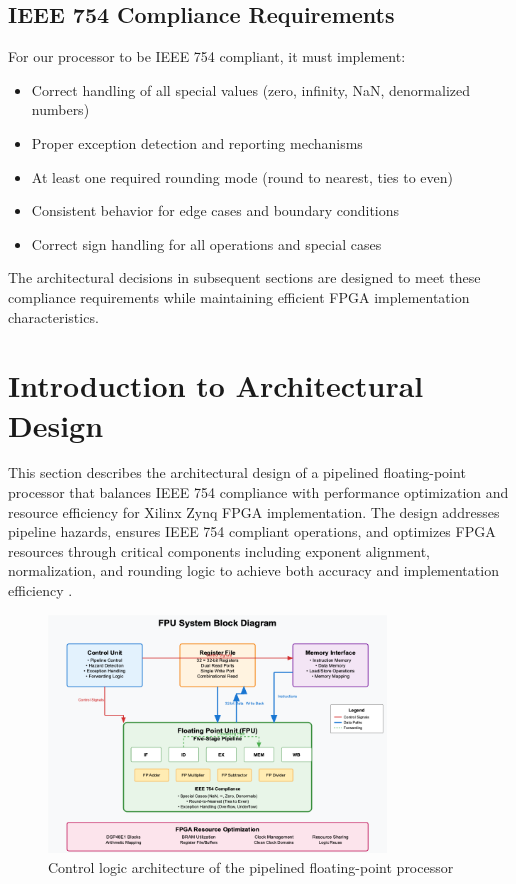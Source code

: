 \subsection{IEEE 754 Compliance Requirements}
\label{subsec:ieee754_compliance}

For our processor to be IEEE 754 compliant, it must implement:

\begin{itemize}
\item Correct handling of all special values (zero, infinity, NaN, denormalized numbers)
\item Proper exception detection and reporting mechanisms
\item At least one required rounding mode (round to nearest, ties to even)
\item Consistent behavior for edge cases and boundary conditions
\item Correct sign handling for all operations and special cases
\end{itemize}

The architectural decisions in subsequent sections are designed to meet these compliance requirements while maintaining efficient FPGA implementation characteristics.

\section{Introduction to Architectural Design}
\label{sec:arch_intro}

This section describes the architectural design of a pipelined floating-point processor that balances IEEE 754 compliance with performance optimization and resource efficiency for Xilinx Zynq FPGA implementation. The design addresses pipeline hazards, ensures IEEE 754 compliant operations, and optimizes FPGA resources through critical components including exponent alignment, normalization, and rounding logic to achieve both accuracy and implementation efficiency \cite{ref16}.

\begin{figure}[h]
\centering
\includegraphics[width=0.8\textwidth]{figures/Con.png}
\caption{Control logic architecture of the pipelined floating-point processor}
\label{fig:control_logic}
\end{figure}

